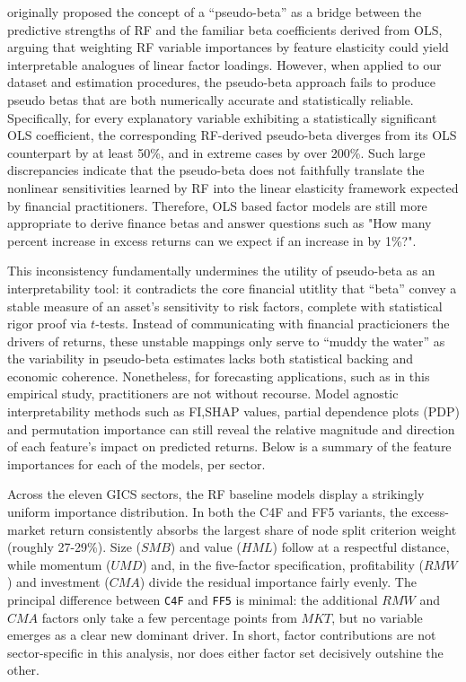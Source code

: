  originally proposed the concept of a “pseudo-beta” as a bridge between the predictive strengths of RF and the familiar beta coefficients derived from OLS, arguing that weighting RF variable importances by feature elasticity could yield interpretable analogues of linear factor loadings. However, when applied to our dataset and estimation procedures, the pseudo-beta approach fails to produce pseudo betas that are both numerically accurate and statistically reliable. Specifically, for every explanatory variable exhibiting a statistically significant OLS coefficient, the corresponding RF-derived pseudo-beta diverges from its OLS counterpart by at least 50\%, and in extreme cases by over 200\%. Such large discrepancies indicate that the pseudo-beta does not faithfully translate the nonlinear sensitivities learned by RF into the linear elasticity framework expected by financial practitioners. Therefore, OLS based factor models are still more appropriate to derive finance betas and answer questions such as "How many percent increase in excess returns can we expect if an increase in by 1\%?".

This inconsistency fundamentally undermines the utility of pseudo-beta as an interpretability tool: it contradicts the core financial utitlity that “beta” convey a stable measure of an asset's sensitivity to risk factors, complete with statistical rigor proof via $t$-tests. Instead of communicating with financial practicioners the drivers of returns, these unstable mappings only serve to “muddy the water” as the variability in pseudo-beta estimates lacks both statistical backing and economic coherence. Nonetheless, for forecasting applications, such as in this empirical study, practitioners are not without recourse. Model agnostic interpretability methods such as FI,SHAP values, partial dependence plots (PDP) and permutation importance can still reveal the relative magnitude and direction of each feature's impact on predicted returns. Below is a summary of the feature importances for each of the models, per sector.

Across the eleven GICS sectors, the RF baseline models display a strikingly uniform importance distribution. In both the C4F and FF5 variants, the excess-market return consistently absorbs the largest share of node split criterion weight (roughly 27-29\%). Size ($SMB$) and value ($HML$) follow at a respectful distance, while momentum ($UMD$) and, in the five-factor specification, profitability ($RMW$) and investment ($CMA$) divide the residual importance fairly evenly. The principal difference between \texttt{C4F} and \texttt{FF5} is minimal: the additional $RMW$ and $CMA$ factors only take a few percentage points from $MKT$, but no variable emerges as a clear new dominant driver. In short, factor contributions are not sector-specific in this analysis, nor does either factor set decisively outshine the other.

